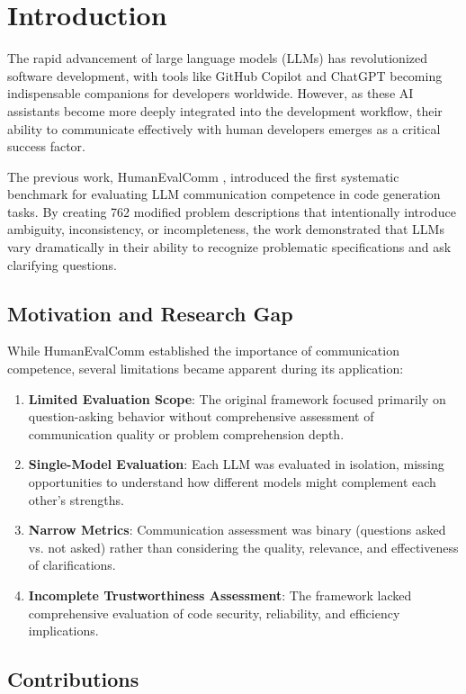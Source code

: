 \documentclass[conference]{IEEEtran}
\begin{document}
\section{Introduction}

The rapid advancement of large language models (LLMs) has revolutionized software development, with tools like GitHub Copilot and ChatGPT becoming indispensable companions for developers worldwide. However, as these AI assistants become more deeply integrated into the development workflow, their ability to communicate effectively with human developers emerges as a critical success factor.

The previous work, HumanEvalComm \cite{wu2025humanevalcomm}, introduced the first systematic benchmark for evaluating LLM communication competence in code generation tasks. By creating 762 modified problem descriptions that intentionally introduce ambiguity, inconsistency, or incompleteness, the work demonstrated that LLMs vary dramatically in their ability to recognize problematic specifications and ask clarifying questions.

\subsection{Motivation and Research Gap}

While HumanEvalComm established the importance of communication competence, several limitations became apparent during its application:

\begin{enumerate}
    \item \textbf{Limited Evaluation Scope}: The original framework focused primarily on question-asking behavior without comprehensive assessment of communication quality or problem comprehension depth.
    \item \textbf{Single-Model Evaluation}: Each LLM was evaluated in isolation, missing opportunities to understand how different models might complement each other's strengths.
    \item \textbf{Narrow Metrics}: Communication assessment was binary (questions asked vs. not asked) rather than considering the quality, relevance, and effectiveness of clarifications.
    \item \textbf{Incomplete Trustworthiness Assessment}: The framework lacked comprehensive evaluation of code security, reliability, and efficiency implications.
\end{enumerate}

\subsection{Contributions}
\end{document}
